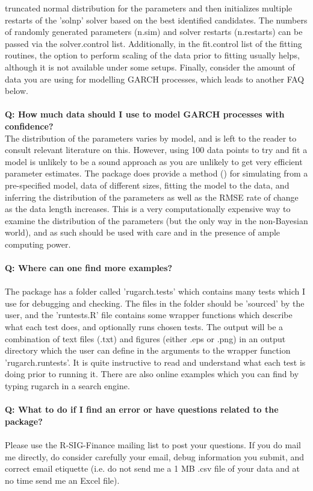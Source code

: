 truncated normal distribution for the parameters and then initializes multiple
restarts of the 'solnp' solver based on the best identified candidates. The
numbers of randomly generated parameters (n.sim) and solver restarts (n.restarts)
can be passed via the solver.control list. Additionally, in the fit.control list
of the fitting routines, the option to perform scaling of the data prior to
fitting usually helps, although it is not available under some setups. Finally,
consider the amount of data you are using for modelling GARCH processes,
which leads to another FAQ below.\\
\\
\textbf{Q: How much data should I use to model GARCH processes with confidence?}\\
The distribution of the parameters varies by model, and is left to the reader to
consult relevant literature on this. However, using 100 data points to try and
fit a model is unlikely to be a sound approach as you are unlikely to get very
efficient parameter estimates. The \verb@rugarch@ package does provide a method
(\verb@ugarchdistribution@) for simulating from a pre-specified model, data of
different sizes, fitting the model to the data, and inferring the distribution
of the parameters as well as the RMSE rate of change as the data length
increases. This is a very computationally expensive way to examine the
distribution of the parameters (but the only way in the non-Bayesian world), and
as such should be used with care and in the presence of ample computing power.\\
\\
\textbf{Q: Where can one find more examples?}\\
\\
The package has a folder called 'rugarch.tests' which contains many tests
which I use for debugging and checking. The files in the folder should be
'sourced' by the user, and the 'runtests.R' file contains some wrapper functions
which describe what each test does, and optionally runs chosen tests. The
output will be a combination of text files (.txt) and figures (either .eps or
.png) in an output directory which the user can define in the arguments to the
wrapper function 'rugarch.runtests'. It is quite instructive to read and
understand what each test is doing prior to running it. There are also online
examples which you can find by typing rugarch in a search engine.\\
\\
\textbf{Q: What to do if I find an error or have questions related to the package?}\\
\\
Please use the R-SIG-Finance mailing list to post your questions. If you do mail
me directly, do consider carefully your email, debug information you submit, and
correct email etiquette (i.e. do not send me a 1 MB .csv file of your data and at
no time send me an Excel file).
